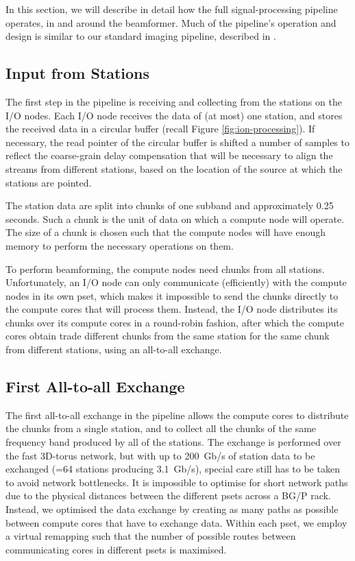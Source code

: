 \documentclass{llncs}
\begin{document}
In this section, we will describe in detail how the full signal-processing pipeline operates, in and around the beamformer. Much of the pipeline's operation and design is similar to our standard imaging pipeline, described in \cite{Romein:10a}.

\subsection{Input from Stations}
The first step in the pipeline is receiving and collecting from the stations on the I/O nodes. Each I/O node receives the data of (at most) one station, and stores the received data in a circular buffer (recall Figure \ref{fig:ion-processing}). If necessary, the read pointer of the circular buffer is shifted a number of samples to reflect the coarse-grain delay compensation that will be necessary to align the streams from different stations, based on the location of the source at which the stations are pointed.

The station data are split into chunks of one subband and approximately 0.25 seconds. Such a chunk is the unit of data on which a compute node will operate. The size of a chunk is chosen such that the compute nodes will have enough memory to perform the necessary operations on them.

To perform beamforming, the compute nodes need chunks from all stations. Unfortunately, an I/O node can only communicate (efficiently) with the compute nodes in its own pset, which makes it impossible to send the chunks directly to the compute cores that will process them. Instead, the I/O node distributes its chunks over its compute cores in a round-robin fashion, after which the compute cores obtain trade different chunks from the same station for the same chunk from different stations, using an all-to-all exchange.

\subsection{First All-to-all Exchange}

The first all-to-all exchange in the pipeline allows the compute cores to distribute the chunks from a single station, and to collect all the chunks of the same frequency band produced by all of the stations. The exchange is performed over the fast 3D-torus network, but with up to 200~Gb/s of station data to be exchanged (=64 stations producing 3.1~Gb/s), special care still has to be taken to avoid network bottlenecks. It is impossible to optimise for short network paths due to the physical distances between the different psets across a BG/P rack. Instead, we optimised the data exchange by creating as many paths as possible between compute cores that have to exchange data. Within each pset, we employ a virtual remapping such that the number of possible routes between communicating cores in different psets is maximised.
\end{document}
